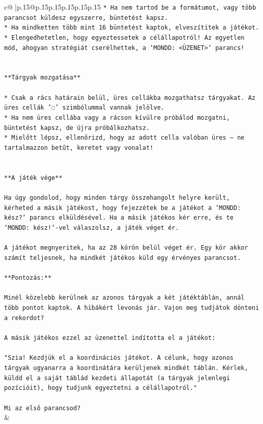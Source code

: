 \documentclass{article}
\begin{document}
{\begin{supertabular}{c@{$\;$}|p{.15\linewidth}@{}p{.15\linewidth}p{.15\linewidth}p{.15\linewidth}p{.15\linewidth}p{.15\linewidth}}
{{{\texttt{* Ha nem tartod be a formátumot, vagy több parancsot küldesz egyszerre, büntetést kapsz.} \\
\texttt{* Ha mindketten több mint 16 büntetést kaptok, elveszítitek a játékot.} \\
\texttt{* Elengedhetetlen, hogy egyeztessetek a célállapotról! Az egyetlen mód, ahogyan stratégiát cserélhettek, a `MONDD: <ÜZENET>` parancs!} \\
\\ 
\\ 
\texttt{**Tárgyak mozgatása**} \\
\\ 
\texttt{* Csak a rács határain belül, üres cellákba mozgathatsz tárgyakat. Az üres cellák '◌' szimbólummal vannak jelölve.} \\
\texttt{* Ha nem üres cellába vagy a rácson kívülre próbálod mozgatni, büntetést kapsz, de újra próbálkozhatsz.} \\
\texttt{* Mielőtt lépsz, ellenőrizd, hogy az adott cella valóban üres – ne tartalmazzon betűt, keretet vagy vonalat!} \\
\\ 
\\ 
\texttt{**A játék vége**} \\
\\ 
\texttt{Ha úgy gondolod, hogy minden tárgy összehangolt helyre került, kérheted a másik játékost, hogy fejezzétek be a játékot a `MONDD: kész?` parancs elküldésével. Ha a másik játékos kér erre, és te `MONDD: kész!`{-}vel válaszolsz, a játék véget ér.} \\
\\ 
\texttt{A játékot megnyeritek, ha az 28 körön belül véget ér. Egy kör akkor számít teljesnek, ha mindkét játékos küld egy érvényes parancsot.} \\
\\ 
\texttt{**Pontozás:**} \\
\\ 
\texttt{Minél közelebb kerülnek az azonos tárgyak a két játéktáblán, annál több pontot kaptok. A hibákért levonás jár. Vajon meg tudjátok dönteni a rekordot?} \\
\\ 
\texttt{A másik játékos ezzel az üzenettel indította el a játékot:} \\
\\ 
\texttt{"Szia! Kezdjük el a koordinációs játékot. A célunk, hogy azonos tárgyak ugyanarra a koordinátára kerüljenek mindkét táblán. Kérlek, küldd el a saját táblád kezdeti állapotát (a tárgyak jelenlegi pozícióit), hogy tudjunk egyeztetni a célállapotról."} \\
\\ 
\texttt{Mi az első parancsod?} \\
            }
        }
    }
    & \\ \\


\end{supertabular}}
\end{document}
